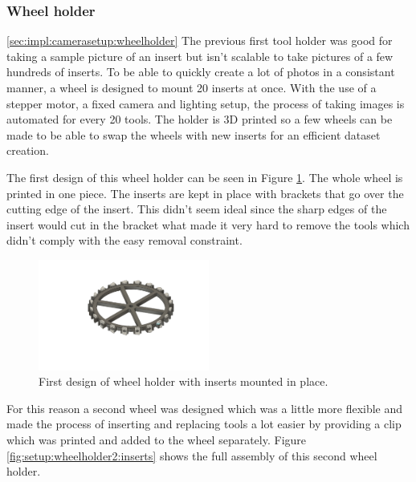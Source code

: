 	\subsubsection{Wheel holder}
	\ref{sec:impl:camerasetup:wheelholder}
	The previous first tool holder was good for taking a sample picture of an insert but isn't scalable to take pictures of a few hundreds of inserts.
	To be able to quickly create a lot of photos in a consistant manner, a wheel is designed to mount 20 inserts at once. With the use of a stepper motor, a fixed camera and lighting setup, the process of taking images is automated for every 20 tools. The holder is 3D printed so a few wheels can be made to be able to swap the wheels with new inserts for an efficient dataset creation.
	
		The first design of this wheel holder can be seen in Figure \ref{fig:setup:wheelholder1:inserts}. 
		The whole wheel is printed in one piece. The inserts are kept in place with brackets that go over the cutting edge of the insert. This didn't seem ideal since the sharp edges of the insert would cut in the bracket what made it very hard to remove the tools which didn't comply with the easy removal constraint. 
		
		\begin{figure}[hbtp]
		\centering
		\includegraphics[width=0.5\textwidth]{fig/Camera_setup/Tool_Holder/Wheel_Holder/first_wheel_holder/radhouderV1_model_inserts.png}
		\caption{First design of wheel holder with inserts mounted in place.}
		\label{fig:setup:wheelholder1:inserts}
		\end{figure}
		
		For this reason a second wheel was designed which was a little more flexible and made the process of inserting and replacing tools a lot easier by providing a clip which was printed and added to the wheel separately. Figure \ref{fig:setup:wheelholder2:inserts} shows the full assembly of this second wheel holder. 
		
